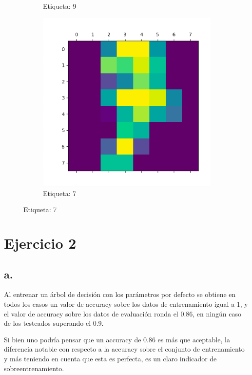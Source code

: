 \documentclass{article}
\begin{document}
\begin{figure}[H]
\begin{subfigure}[b]{0.3\textwidth}
		\caption{Etiqueta: 9}
	\end{subfigure}
	\begin{subfigure}[b]{0.3\textwidth}
		\centering
		\includegraphics*[scale=0.2]{muestra7.png}
		\caption{Etiqueta: 7}
	\end{subfigure}
\end{figure}

\section*{Ejercicio 2}

\subsection*{a.}

Al entrenar un árbol de decisión con los parámetros por defecto se obtiene en todos los casos un valor de accuracy sobre los datos de entrenamiento igual a 1, y el valor de accuracy sobre los datos de evaluación ronda el 0.86, en ningún caso de los testeados superando el 0.9.

Si bien uno podría pensar que un accuracy de 0.86 es más que aceptable, la diferencia notable con respecto a la accuracy sobre el conjunto de entrenamiento y más teniendo en cuenta que esta es perfecta, es un claro indicador de sobreentrenamiento.
\end{document}
